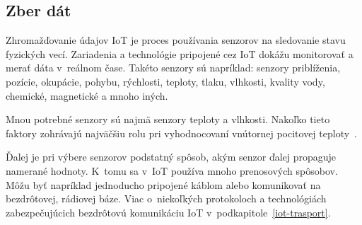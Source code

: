 \subsection{Zber dát}\label{iot-colection}
Zhromažďovanie údajov IoT je proces používania senzorov na sledovanie stavu fyzických vecí. 
Zariadenia a technológie pripojené cez IoT dokážu monitorovať a merať dáta v~reálnom čase. 
Takéto senzory sú napríklad: senzory priblíženia, pozície, okupácie, pohybu, rýchlosti, teploty, tlaku, vlhkosti, kvality vody, chemické, magnetické a mnoho iných.~\cite{8862778}

Mnou potrebné senzory sú najmä senzory teploty a vlhkosti. 
Nakoľko tieto faktory zohrávajú najväčšiu rolu pri vyhodnocovaní vnútornej pocitovej teploty~\cite{AUniversalScaleofApparentTemperature}. 

Ďalej je pri výbere senzorov podstatný spôsob, akým senzor ďalej propaguje namerané hodnoty. 
K~tomu sa v~IoT používa mnoho prenosových spôsobov. 
Môžu byť napríklad jednoducho pripojené káblom alebo komunikovať na bezdrôtovej, rádiovej báze. 
Viac o~niekoľkých protokoloch a technológiách zabezpečujúcich bezdrôtovú komunikáciu IoT v~podkapitole~\ref{iot-trasport}.


